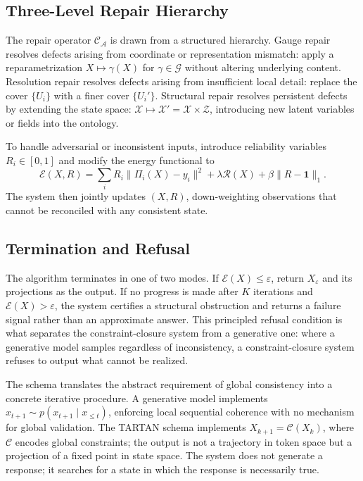 \documentclass[11pt, oneside]{article}
\begin{document}
\subsection{Three-Level Repair Hierarchy}

The repair operator $\mathcal{C}_\mathcal{A}$ is drawn from a structured hierarchy. Gauge repair resolves defects arising from coordinate or representation mismatch: apply a reparametrization $X \mapsto \gamma(X)$ for $\gamma \in \mathcal{G}$ without altering underlying content. Resolution repair resolves defects arising from insufficient local detail: replace the cover $\{U_i\}$ with a finer cover $\{U_i'\}$. Structural repair resolves persistent defects by extending the state space: $\mathcal{X} \mapsto \mathcal{X}' = \mathcal{X} \times \mathcal{Z}$, introducing new latent variables or fields into the ontology.

To handle adversarial or inconsistent inputs, introduce reliability variables $R_i \in [0,1]$ and modify the energy functional to
\[
\mathcal{E}(X, R) = \sum_i R_i \|\Pi_i(X) - y_i\|^2 + \lambda \mathcal{R}(X) + \beta \|R - \mathbf{1}\|_1.
\]
The system then jointly updates $(X, R)$, down-weighting observations that cannot be reconciled with any consistent state.

\subsection{Termination and Refusal}

The algorithm terminates in one of two modes. If $\mathcal{E}(X) \leq \varepsilon$, return $X_\varepsilon$ and its projections as the output. If no progress is made after $K$ iterations and $\mathcal{E}(X) > \varepsilon$, the system certifies a structural obstruction and returns a failure signal rather than an approximate answer. This principled refusal condition is what separates the constraint-closure system from a generative one: where a generative model samples regardless of inconsistency, a constraint-closure system refuses to output what cannot be realized.

The schema translates the abstract requirement of global consistency into a concrete iterative procedure. A generative model implements $x_{t+1} \sim p(x_{t+1} \mid x_{\leq t})$, enforcing local sequential coherence with no mechanism for global validation. The TARTAN schema implements $X_{k+1} = \mathcal{C}(X_k)$, where $\mathcal{C}$ encodes global constraints; the output is not a trajectory in token space but a projection of a fixed point in state space. The system does not generate a response; it searches for a state in which the response is necessarily true.
\end{document}
